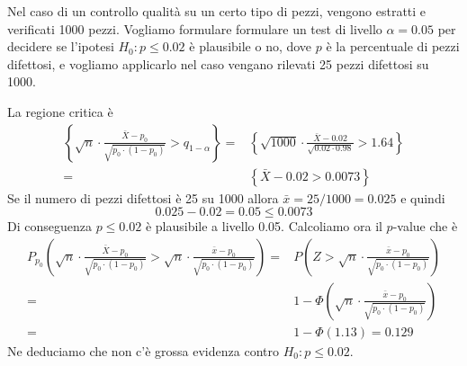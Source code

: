\begin{example}
	Nel caso di un controllo qualità su un certo tipo di pezzi, vengono estratti e verificati 1000
	pezzi. Vogliamo formulare formulare un test di livello $\alpha = 0.05$ per decidere se
	l'ipotesi $H_0 : p \leq 0.02$ è plausibile o no, dove $p$ è la percentuale di pezzi difettosi,
	e vogliamo applicarlo nel caso vengano rilevati 25 pezzi difettosi su 1000.

	La regione critica è
	\begin{align*}
		\left\{ \sqrt{n} \cdot \frac{\bar{X} - p_0}{\sqrt{p_0 \cdot (1-p_0)}}
		> q_{1-\alpha} \right\} = &
		\left\{ \sqrt{1000} \cdot \frac{\bar{X} - 0.02}{\sqrt{0.02 \cdot 0.98}} > 1.64 \right\} \\
		=                         & \left\{ \bar{X} - 0.02 > 0.0073 \right\}
	\end{align*}
	Se il numero di pezzi difettosi è 25 su 1000 allora $\bar{x} = 25 / 1000 = 0.025$ e quindi
	\[ 0.025 - 0.02 = 0.05 \leq 0.0073 \]
	Di conseguenza $p \leq 0.02$ è plausibile a livello 0.05. Calcoliamo ora il $p$-value che è
	\begin{align*}
		P_{p_0} \left( \sqrt{n} \cdot \frac{\bar{X} - p_0}{\sqrt{p_0 \cdot (1-p_0)}} >
		\sqrt{n} \cdot \frac{\bar{x} - p_0}{\sqrt{p_0 \cdot (1-p_0)}} \right) = &
		P \left( Z > \sqrt{n} \cdot \frac{\bar{x} - p_0}{\sqrt{p_0 \cdot (1-p_0)}} \right)    \\
		=                                                                       &
		1 - \Phi \left( \sqrt{n} \cdot \frac{\bar{x} - p_0}{\sqrt{p_0 \cdot (1-p_0)}} \right) \\
		=                                                                       &
		1 - \Phi(1.13) = 0.129
	\end{align*}
	Ne deduciamo che non c'è grossa evidenza contro $H_0 : p \leq 0.02$.
\end{example}